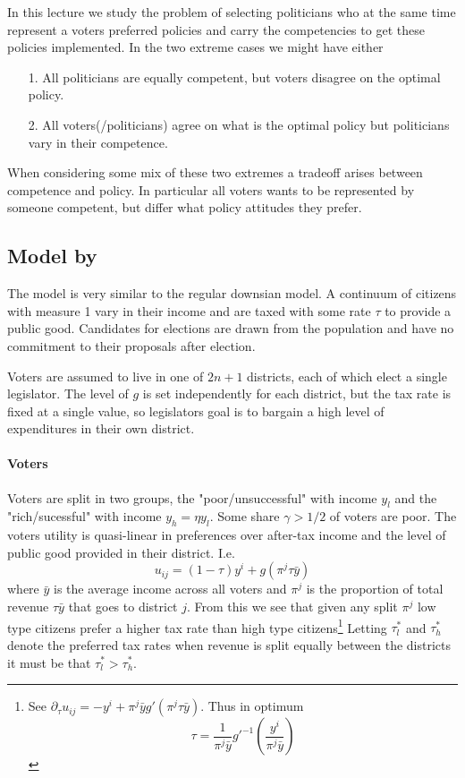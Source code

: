 In this lecture we study the problem of selecting politicians who at the same time represent a voters preferred policies and carry the competencies to get these policies implemented. In the two extreme cases we might have either 
\begin{itemize}
    \item[1.] All politicians are equally competent, but voters disagree on the optimal policy.
    \item[2.] All voters(/politicians) agree on what is the optimal policy but politicians vary in their competence.
\end{itemize}
When considering some mix of these two extremes a tradeoff arises between competence and policy. In particular all voters wants to be represented by someone competent, but differ what policy attitudes they prefer.

\subsection{Model by \cite{mattozzi_right_2018}}
The model is very similar to the regular downsian model. A continuum of citizens with measure 1 vary in their income and are taxed with some rate $\tau$ to provide a public good. Candidates for elections are drawn from the population and have no commitment to their proposals after election. 

Voters are assumed to live in one of $2n +1$ districts, each of which elect a single legislator. The level of $g$ is set independently for each district, but the tax rate is fixed at a single value, so legislators goal is to bargain a high level of expenditures in their own district.

\paragraph{Voters} 
Voters are split in two groups, the "poor/unsuccessful" with income $y_l$ and the "rich/sucessful" with income $y_h = \eta y_l$. Some share $\gamma>1/2$ of voters are poor. 
The voters utility is quasi-linear in preferences over after-tax income and the level of public good provided in their district. I.e.
\begin{equation}
    u_{ij} =(1-\tau) y^i + g(\pi^j \tau \bar{y})
\end{equation}
where $\bar{y}$ is the average income across all voters and $\pi^j$ is the proportion of total revenue $\tau \bar{y}$ that goes to district $j$. From this we see that given any split $\pi^j$ low type citizens prefer a higher tax rate than high type citizens\footnote{See $\partial_{\tau} u_{ij}=-y^i + \pi^j \bar{y} g'(\pi^j \tau \bar{y})$. Thus in optimum 
\begin{equation}
    \tau = \frac{1}{\pi^j \bar{y}} g'^{-1}(\frac{y^i}{\pi^j \bar{y}})
\end{equation}}
Letting $\tau_l^*$ and $\tau_h^*$ denote the preferred tax rates when revenue is split equally between the districts it must be that $\tau_l^* > \tau_h^*$. 

